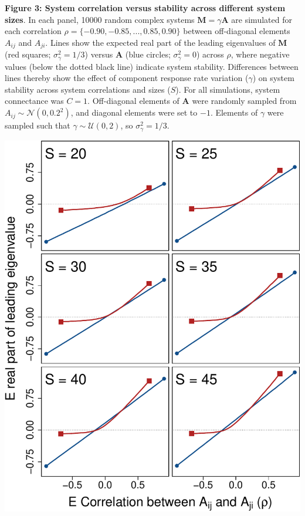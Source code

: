 \documentclass[]{article}
\begin{document}
\clearpage

\textbf{Figure 3: System correlation versus stability across different
system sizes}. In each panel, 10000 random complex systems
\(\mathbf{M} = \gamma \mathbf{A}\) are simulated for each correlation
\(\rho = \{-0.90, -0.85, ..., 0.85, 0.90 \}\) between off-diagonal
elements \(A_{ij}\) and \(A_{ji}\). Lines show the expected real part of
the leading eigenvalues of \(\mathbf{M}\) (red squares;
\(\sigma^{2}_{\gamma} = 1/3\)) versus \(\mathbf{A}\) (blue circles;
\(\sigma^{2}_{\gamma} = 0\)) across \(\rho\), where negative values
(below the dotted black line) indicate system stability. Differences
between lines thereby show the effect of component response rate
variation (\(\gamma\)) on system stability across system correlations
and sizes (\(S\)). For all simulations, system connectance was
\(C = 1\). Off-diagonal elements of \(\textbf{A}\) were randomly sampled
from \(A_{ij} \sim \mathcal{N}(0, 0.2^{2})\), and diagonal elements were
set to \(-1\). Elements of \(\gamma\) were sampled such that
\(\gamma \sim \mathcal{U}(0, 2)\), so \(\sigma^{2}_{\gamma} = 1/3\).

\includegraphics{ms_files/figure-latex/unnamed-chunk-12-1.pdf}
\end{document}
